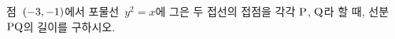 점~$(-3{,}\mkern3mu\mathopen{}-1)$에서 포물선~$y^2=x$에 그은 두 접선의 접점을 각각 $\mathrm{P}$, $\mathrm{Q}$라 할 때, 선분~$\mathrm{PQ}$의 길이를 구하시오.
